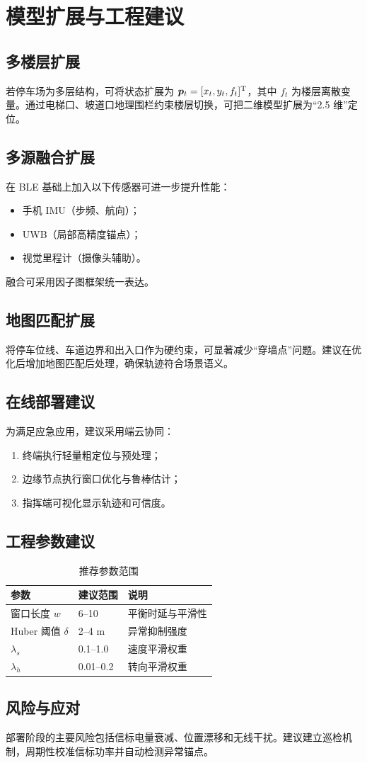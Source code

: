 \chapter{模型扩展与工程建议}

\section{多楼层扩展}
若停车场为多层结构，可将状态扩展为 $\bm p_t=[x_t,y_t,f_t]^{\mathrm{T}}$，其中 $f_t$ 为楼层离散变量。通过电梯口、坡道口地理围栏约束楼层切换，可把二维模型扩展为“2.5 维”定位。

\section{多源融合扩展}
在 BLE 基础上加入以下传感器可进一步提升性能：
\begin{itemize}
  \item 手机 IMU（步频、航向）；
  \item UWB（局部高精度锚点）；
  \item 视觉里程计（摄像头辅助）。
\end{itemize}
融合可采用因子图框架统一表达。

\section{地图匹配扩展}
将停车位线、车道边界和出入口作为硬约束，可显著减少“穿墙点”问题。建议在优化后增加地图匹配后处理，确保轨迹符合场景语义。

\section{在线部署建议}
为满足应急应用，建议采用端云协同：
\begin{enumerate}
  \item 终端执行轻量粗定位与预处理；
  \item 边缘节点执行窗口优化与鲁棒估计；
  \item 指挥端可视化显示轨迹和可信度。
\end{enumerate}

\section{工程参数建议}
\begin{table}[H]
\centering
\caption{推荐参数范围}
\begin{tabular}{lll}
\toprule
参数 & 建议范围 & 说明 \\
\midrule
窗口长度 $w$ & 6--10 & 平衡时延与平滑性 \\
Huber 阈值 $\delta$ & 2--4 m & 异常抑制强度 \\
$\lambda_s$ & 0.1--1.0 & 速度平滑权重 \\
$\lambda_h$ & 0.01--0.2 & 转向平滑权重 \\
\bottomrule
\end{tabular}
\end{table}

\section{风险与应对}
部署阶段的主要风险包括信标电量衰减、位置漂移和无线干扰。建议建立巡检机制，周期性校准信标功率并自动检测异常锚点。
